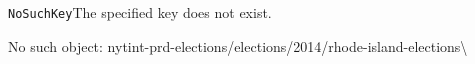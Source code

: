 \texttt{NoSuchKey}The specified key does not exist.

No such object:
nytint-prd-elections/elections/2014/rhode-island-elections\textbackslash{}
